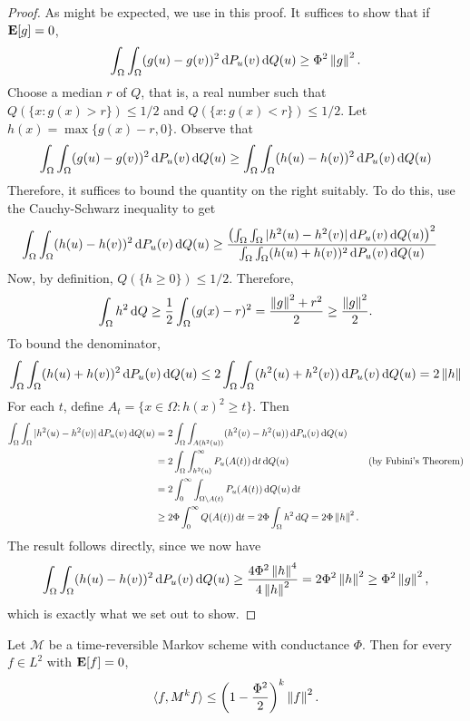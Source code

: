 \begin{proof}
	As might be expected, we use  in this proof. It suffices to show that if $\textbf{E}[g]=0$,
	\[ \int_\Omega \int_\Omega (g(u)-g(v))^2 \operatorname{d}\!{P}_u(v)\operatorname{d}\!{Q}(u) \geq \Phi^2 \left\lVert g\right\rVert^2. \]
	Choose a median $r$ of $Q$, that is, a real number such that $Q(\{x:g(x)>r\}) \leq 1/2$ and $Q(\{x:g(x)<r\}) \leq 1/2$. Let $h(x)=\max\{g(x)-r,0\}$. Observe that
	\[ \int_\Omega \int_\Omega (g(u)-g(v))^2 \operatorname{d}\!{P}_u(v)\operatorname{d}\!{Q}(u) \geq \int_\Omega \int_\Omega (h(u)-h(v))^2 \operatorname{d}\!{P}_u(v)\operatorname{d}\!{Q}(u) \]
	Therefore, it suffices to bound the quantity on the right suitably. To do this, use the Cauchy-Schwarz inequality to get
	\begin{align*}
		\int_\Omega \int_\Omega (h(u)-h(v))^2 \operatorname{d}\!{P}_u(v)\operatorname{d}\!{Q}(u) &\geq \frac{\left(\int_\Omega \int_\Omega |h^2(u)-h^2(v)| \operatorname{d}\!{P}_u(v)\operatorname{d}\!{Q}(u)\right)^2}{\int_\Omega \int_\Omega (h(u)+h(v))^2 \operatorname{d}\!{P}_u(v)\operatorname{d}\!{Q}(u)}
	\end{align*}
	Now, by definition, $Q(\{h\geq 0\})\leq 1/2$. Therefore,
	\[ \int_\Omega h^2\operatorname{d}\!{Q} \geq \frac{1}{2} \int_\Omega (g(x)-r)^2 = \frac{\left\lVert g\right\rVert^2+r^2}{2} \geq \frac{\left\lVert g\right\rVert^2}{2}. \]
	To bound the denominator,
	\[ \int_\Omega \int_\Omega (h(u)+h(v))^2 \operatorname{d}\!{P}_u(v)\operatorname{d}\!{Q}(u) \leq 2 \int_\Omega \int_\Omega (h^2(u)+h^2(v)) \operatorname{d}\!{P}_u(v)\operatorname{d}\!{Q}(u) = 2\left\lVert h\right\rVert \]
	For each $t$, define $A_t = \{x\in\Omega : h(x)^2 \geq t\}$. Then
	\begin{align*}
		\int_\Omega \int_\Omega |h^2(u)-h^2(v)| \d{P}_u(v)\d{Q}(u) &= 2 \int_\Omega \int_{A(h^2(u))} (h^2(v)-h^2(u)) \d{P}_u(v)\d{Q}(u) \\
			&= 2 \int_\Omega \int_{h^2(u)}^\infty P_u(A(t)) \d{t}\d{Q}(u) & (\text{by Fubini's Theorem}) \\
			&= 2 \int_0^\infty \int_{\Omega\setminus A(t)} P_u(A(t)) \d{Q}(u)\d{t} \\
			&\geq 2\Phi \int_0^\infty Q(A(t))\d{t} = 2\Phi \int_\Omega h^2\d{Q} = 2\Phi\norm{h}^2.
	\end{align*}
	The result follows directly, since we now have
	\[ \int_\Omega \int_\Omega (h(u)-h(v))^2 \operatorname{d}\!{P}_u(v)\operatorname{d}\!{Q}(u) \geq \frac{4\Phi^2\left\lVert h\right\rVert^4}{4\left\lVert h\right\rVert^2} = 2\Phi^2\left\lVert h\right\rVert^2 \geq \Phi^2\left\lVert g\right\rVert^2, \]
	which is exactly what we set out to show.
\end{proof}

\begin{corollary}
	Let $\mathcal{M}$ be a time-reversible Markov scheme with conductance $\Phi$. Then for every $f\in L^2$ with $\textbf{E}[f]=0$,
	\[ \langle f,M^k f\rangle \leq \left(1-\frac{\Phi^2}{2}\right)^k\left\lVert f\right\rVert^2. \]
\end{corollary}

